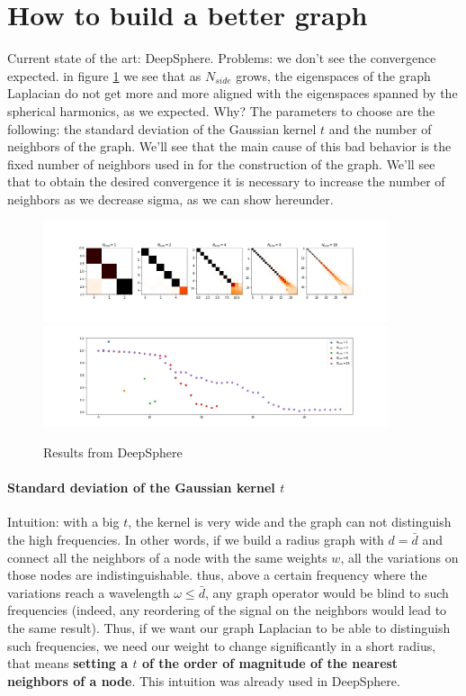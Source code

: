
\section{How to build a better graph}
Current state of the art: DeepSphere.
Problems: we don't see the convergence expected. in figure \ref{fig:DeepSphere} we see that as $N_{side}$ grows, the eigenspaces of the graph Laplacian do not get more and more aligned with the eigenspaces spanned by the spherical harmonics, as we expected. Why? The parameters to choose are the following: the standard deviation of the Gaussian kernel $t$ and the number of neighbors of the graph. We'll see that the main cause of this bad behavior is the fixed number of neighbors used in \cite{DeepSphere} for the construction of the graph. We'll see that to obtain the desired convergence it is necessary to increase the number of neighbors as we decrease sigma, as we can show hereunder.
\begin{figure}[h]
	\label{fig:DeepSphere}
	\caption{Results from DeepSphere}
	\centering
	\includegraphics[width=0.9\textwidth]{../codes/06_figures/deepsphere_original.png}
	\includegraphics[width=0.9\textwidth]{../codes/06_figures/deepsphere_original_diagonal.png}	
\end{figure}

\paragraph{Standard deviation of the Gaussian kernel $t$}
Intuition: with a big $t$, the kernel is very wide and the graph can not distinguish the high frequencies. In other words, if we build a radius graph with $d=\bar d$ and connect all the neighbors of a node with the same weights $w$, all the variations on those nodes are indistinguishable. thus, above a certain frequency where the variations reach a wavelength $\omega \leq \bar d$, any graph operator would be blind to such frequencies (indeed, any reordering of the signal on the neighbors would lead to the same result). Thus, if we want our graph Laplacian to be able to distinguish such frequencies, we need our weight to change significantly in a short radius, that means \textbf{setting a $t$ of the order of magnitude of the nearest neighbors of a node}. This intuition was already used in DeepSphere. 


